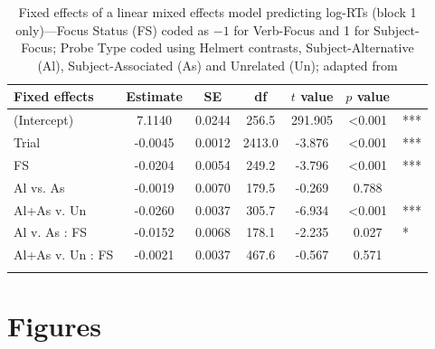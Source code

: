 \begin{table}
\begin{tabularx}{.9\textwidth}{X@{}S@{}S@{~~~}S@{\hspace{-6pt}}S@{~~~}S@{~~}l}
\lsptoprule
Fixed effects&{Estimate}&{SE}&{df}&{$t$ value}&{$p$ value}\\
\midrule
(Intercept)&7.1140&0.0244&256.5&291.905&<0.001&***\\[.5ex]
Trial&-0.0045&0.0012&2413.0&-3.876&<0.001&***\\[.5ex]
FS&-0.0204&0.0054&249.2&-3.796&<0.001&***\\[.5ex]
Al vs. As&-0.0019&0.0070&179.5&-0.269&0.788\\[.5ex]
Al+As v. Un&-0.0260&0.0037&305.7&-6.934&<0.001&***\\[.5ex]
Al v. As : FS&-0.0152&0.0068&178.1&-2.235&0.027&*\\[.5ex]
Al+As v. Un : FS&-0.0021&0.0037&467.6&-0.567&0.571\\
\lspbottomrule
\end{tabularx}
\caption{Fixed effects of a linear mixed effects model predicting log-RTs (block 1 only)---Focus Status (FS) coded as $-1$ for Verb-Focus and 1 for Subject-Focus; Probe Type coded using Helmert contrasts, Subject-Alternative (Al), Subject-Associated (As) and Unrelated (Un); adapted from \citet[375]{Lacina.etal2023}}
\label{sim:tab:lacina}
\end{table}


\section{Figures}

